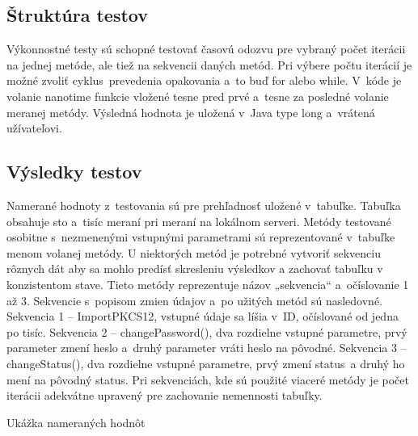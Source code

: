 \documentclass[
  digital, %
  table,   %
oneside,
  nolof,     %
  nolot,     %
]{fithesis3}
\begin{document}
\subsection{Štruktúra testov}
Výkonnostné testy sú schopné testovať časovú odozvu pre vybraný počet iterácii na jednej metóde, ale tiež na sekvencii daných metód. Pri výbere počtu iterácií je možné zvoliť cyklus~prevedenia opakovania a~to buď for alebo while.  V~kóde je  volanie nanotime funkcie vložené tesne pred prvé a~tesne za posledné volanie meranej metódy. Výsledná hodnota je uložená v~Java type long a~vrátená užívateľovi.
\subsection{Výsledky testov}
Namerané hodnoty z~testovania sú pre prehľadnosť uložené v~tabuľke. Tabuľka obsahuje sto a~tisíc meraní pri meraní na lokálnom serveri. Metódy testované osobitne s~nezmenenými vstupnými parametrami sú reprezentované v~tabuľke menom volanej metódy. U niektorých metód je potrebné vytvoriť sekvenciu rôznych dát aby sa mohlo predísť skresleniu výsledkov a zachovať tabuľku v konzistentom stave. Tieto metódy reprezentuje názov „sekvencia“ a~očíslovanie 1 až 3. Sekvencie s~popisom zmien údajov  a~po užitých metód sú nasledovné.
Sekvencia 1 – ImportPKCS12, vstupné údaje sa líšia v~ID, očíslované od jedna po tisíc.
Sekvencia 2 – changePassword(), dva rozdielne vstupné parametre, prvý parameter zmení heslo  a~druhý parameter vráti heslo na pôvodné.
Sekvencia 3 – changeStatus(), dva rozdielne vstupné parametre, prvý zmení status~a druhý ho mení na pôvodný status. 
Pri sekvenciách, kde sú použité viaceré metódy je počet iterácii adekvátne upravený pre zachovanie nemennosti tabuľky. 

\begin{table}[htbp]

\caption{Ukážka nameraných hodnôt}
\label{table:power}
\end{table}
\end{document}
